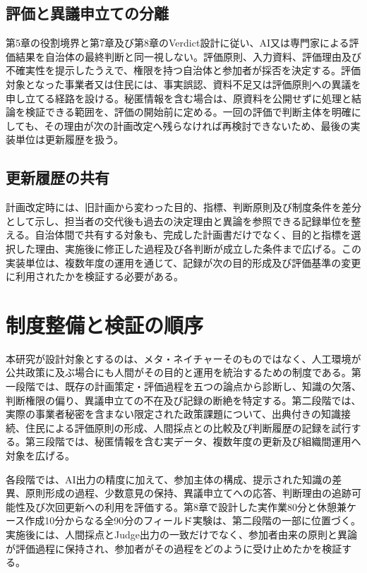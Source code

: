 \subsection{評価と異議申立ての分離}

第5章の役割境界と第7章及び第8章のVerdict設計に従い、AI又は専門家による評価結果を自治体の最終判断と同一視しない。評価原則、入力資料、評価理由及び不確実性を提示したうえで、権限を持つ自治体と参加者が採否を決定する。評価対象となった事業者又は住民には、事実誤認、資料不足又は評価原則への異議を申し立てる経路を設ける。秘匿情報を含む場合は、原資料を公開せずに処理と結論を検証できる範囲を、評価の開始前に定める。一回の評価で判断主体を明確にしても、その理由が次の計画改定へ残らなければ再検討できないため、最後の実装単位は更新履歴を扱う。

\subsection{更新履歴の共有}

計画改定時には、旧計画から変わった目的、指標、判断原則及び制度条件を差分として示し、担当者の交代後も過去の決定理由と異論を参照できる記録単位を整える。自治体間で共有する対象も、完成した計画書だけでなく、目的と指標を選択した理由、実施後に修正した過程及び各判断が成立した条件まで広げる。この実装単位は、複数年度の運用を通じて、記録が次の目的形成及び評価基準の変更に利用されたかを検証する必要がある。

\section{制度整備と検証の順序}
\label{sec:ch9_implementation}

本研究が設計対象とするのは、メタ・ネイチャーそのものではなく、人工環境が公共政策に及ぶ場合にも人間がその目的と運用を統治するための制度である。第一段階では、既存の計画策定・評価過程を五つの論点から診断し、知識の欠落、判断権限の偏り、異議申立ての不在及び記録の断絶を特定する。第二段階では、実際の事業者秘密を含まない限定された政策課題について、出典付きの知識接続、住民による評価原則の形成、人間採点との比較及び判断履歴の記録を試行する。第三段階では、秘匿情報を含む実データ、複数年度の更新及び組織間運用へ対象を広げる。

各段階では、AI出力の精度に加えて、参加主体の構成、提示された知識の差異、原則形成の過程、少数意見の保持、異議申立てへの応答、判断理由の追跡可能性及び次回更新への利用を評価する。第8章で設計した実作業80分と休憩兼ケース作成10分からなる全90分のフィールド実験は、第二段階の一部に位置づく。実施後には、人間採点とJudge出力の一致だけでなく、参加者由来の原則と異論が評価過程に保持され、参加者がその過程をどのように受け止めたかを検証する。

